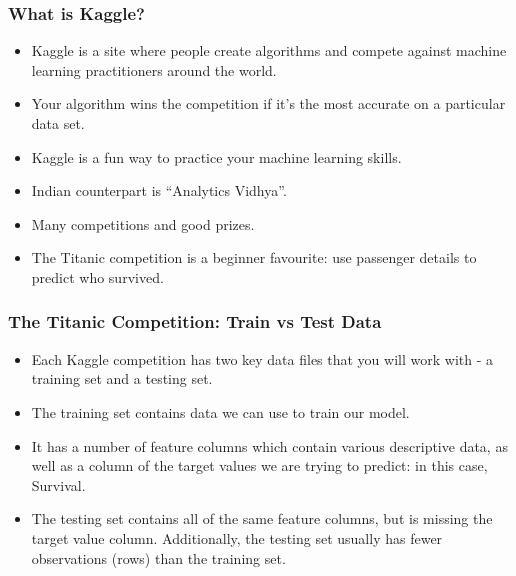 \begin{frame}[fragile]\frametitle{What is Kaggle?}
\begin{itemize}
\item Kaggle is a site where people create algorithms and compete against machine learning practitioners around the world. 
\item Your algorithm wins the competition if it's the most accurate on a particular data set. 
\item Kaggle is a fun way to practice your machine learning skills.
\item Indian counterpart is ``Analytics Vidhya''. 
\item Many competitions and good prizes.
\item The Titanic competition is a beginner favourite: use passenger details to predict who survived.
\end{itemize}
\end{frame}




\begin{frame}[fragile]\frametitle{The Titanic Competition: Train vs Test Data}
\begin{itemize}
\item Each Kaggle competition has two key data files that you will work with - a training set and a testing set.
\item The training set contains data we can use to train our model. 
\item It has a number of feature columns which contain various descriptive data, as well as a column of the target values we are trying to predict: in this case, Survival.
\item The testing set contains all of the same feature columns, but is missing the target value column. Additionally, the testing set usually has fewer observations (rows) than the training set.
\end{itemize}
\end{frame}

